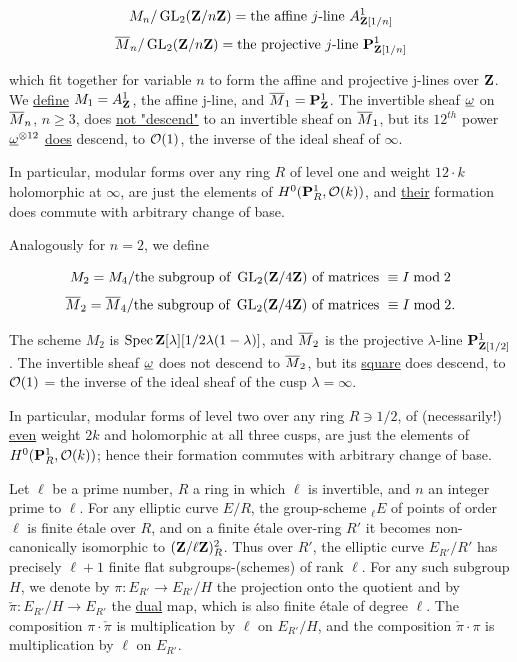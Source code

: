 \[
M_n/\operatorname{GL}_2(\mathbf{Z}/n\mathbf{Z}) = \text{the affine } j\text{-line } A^1_{\mathbf{Z}[1/n]}
\]
\[
\overline{M}_n/\operatorname{GL}_2(\mathbf{Z}/n\mathbf{Z}) = \text{the projective } j\text{-line } \mathbf{P}^1_{\mathbf{Z}[1/n]}
\]

which fit together for variable $n$ to form the affine and projective j-lines
over $\mathbf{Z}$. We \uline{define} $M_1 = A^1_{\mathbf{Z}}$, the affine j-line, and
$\overline{M}_1 = \mathbf{P}^1_{\mathbf{Z}}$. The invertible sheaf $\underline{\omega}$ on $\overline{M}_n$, $n\geq 3$, does
\uline{not "descend"} to an invertible sheaf on $\overline{M}_1$, but its $12^{th}$
power $\underline{\omega}^{\otimes 12}$ \uline{does} descend, to $\mathcal{O}(1)$, the inverse of the
ideal sheaf of $\infty$.

In particular, modular forms over any ring $R$ of level one and weight $12\cdot k$
holomorphic at $\infty$, are just the elements of $H^0(\mathbf{P}^1_R,\mathcal{O}(k))$, and
\uline{their} formation does commute with arbitrary change of base.

Analogously for $n=2$, we define

\[
M_2 = M_4/\text{the subgroup of } \operatorname{GL}_2(\mathbf{Z}/4\mathbf{Z}) \text{ of matrices } \equiv I\bmod 2
\]
\[
\overline{M}_2 = \overline{M}_4/\text{the subgroup of } \operatorname{GL}_2(\mathbf{Z}/4\mathbf{Z}) \text{ of matrices } \equiv I\bmod 2.
\]

The scheme $M_2$ is $\operatorname{Spec}\mathbf{Z}[\lambda][1/2\lambda(1-\lambda)]$, and $\overline{M}_2$ is
the projective $\lambda$-line $\mathbf{P}^1_{\mathbf{Z}[1/2]}$. The invertible sheaf $\underline{\omega}$ does
not descend to $\overline{M}_2$, but its \uline{square} does descend, to $\mathcal{O}(1)$ =
the inverse of the ideal sheaf of the cusp $\lambda = \infty$.

In particular, modular forms of level two over any ring $R\ni 1/2$, of
(necessarily!) \uline{even} weight $2k$ and holomorphic at all three cusps,
are just the elements of $H^0(\mathbf{P}^1_R,\mathcal{O}(k))$; hence their formation commutes
with arbitrary change of base.


Let $\ell$ be a prime number, $R$ a ring in which $\ell$ is invertible, and $n$
an integer prime to $\ell$. For any elliptic curve $E/R$, the group-scheme
${}_\ell E$ of points of order $\ell$ is finite étale over $R$, and on a finite
étale over-ring $R'$ it becomes non-canonically isomorphic to $(\mathbf{Z}/\ell\mathbf{Z})^2_R$.
Thus over $R'$, the elliptic curve $E_{R'}/R'$ has precisely $\ell+1$ finite
flat subgroups-(schemes) of rank $\ell$. For any such subgroup $H$, we denote
by $\pi\colon E_{R'}\to E_{R'}/H$ the projection onto the quotient and by
$\check\pi\colon E_{R'}/H\to E_{R'}$ the \uline{dual} map, which is also finite
étale of degree $\ell$. The composition $\pi\cdot\check\pi$ is multiplication by
$\ell$ on $E_{R'}/H$, and the composition $\check\pi\cdot\pi$ is multiplication
by $\ell$ on $E_{R'}$.

